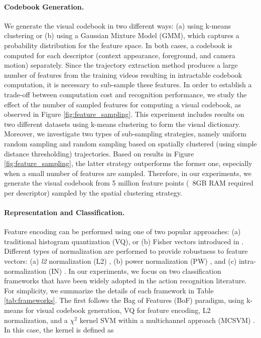 \documentclass[runningheads]{llncs}
\begin{document}
\paragraph{Codebook Generation.} We generate the visual codebook in two different ways: (a) using k-means clustering or (b) using a Gaussian Mixture Model (GMM), which captures a probability distribution for the feature space. In both cases, a codebook is computed for each descriptor (context appearance, foreground, and camera motion) separately. Since the trajectory extraction method produces a large number of features from the training videos resulting in intractable codebook computation, it is necessary to sub-sample these features. In order to establish a trade-off between computation cost and recognition performance, we study the effect of the number of sampled features for computing a visual codebook, as observed in Figure \ref{fig:feature_sampling}. This experiment includes results on two different datasets using k-means clustering to form the visual dictionary. Moreover, we investigate two types of sub-sampling strategies, namely uniform random sampling and random sampling based on spatially clustered (using simple distance thresholding) trajectories. Based on results in Figure \ref{fig:feature_sampling}, the latter strategy outperforms the former one, especially when a small number of features are sampled. Therefore, in our experiments, we generate the visual codebook from 5 million feature points (~8GB RAM required per descriptor) sampled by the spatial clustering strategy.

\paragraph{Representation and Classification.} Feature encoding can be performed using one of two popular approaches: (a) traditional histogram quantization (VQ), or (b) Fisher vectors introduced in \cite{perronnin2010}. Different types of normalization are performed to provide robustness to feature vectors: (a) \textit{l2} normalization (L2) \cite{perronnin2010}, (b) power normalization (PW) \cite{perronnin2010}, and (c) intra-normalization (IN) \cite{xwang2013}. In our experiments, we focus on two classification frameworks that have been widely adopted in the action recognition literature. For simplicity, we summarize the details of each framework in Table \ref{tab:frameworks}. The first follows the Bag of Features (BoF) paradigm, using k-means for visual codebook generation, VQ for feature encoding, L2 normalization, and a $\chi^2$ kernel SVM within a multichannel approach (MCSVM) \cite{zhang2007}. In this case, the kernel is defined as
\end{document}
